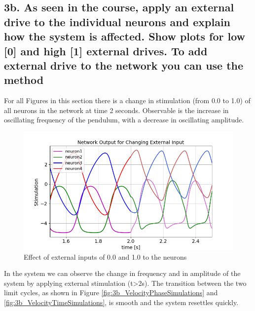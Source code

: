 \documentclass{cmc}
\begin{document}
\subsection*{3b. As seen in the course, apply an external drive to the
  individual neurons and explain how the system is affected. Show
  plots for low [0] and high [1] external drives. To add external
  drive to the network you can use the method \\
   }
\label{sec:4c}

For all Figures in this section there is a change in stimulation (from 0.0 to 1.0) of all neurons in the network at time 2 seconds. Observable is the increase in oscillating frequency of the pendulum, with a decrease in oscillating amplitude. 

\begin{figure}[H]
      \centering
      \includegraphics[width=.7\textwidth]{3b/3b-output.png}
      \caption{Effect of external inputs of 0.0 and 1.0 to the neurons}
      \label{fig:3b_NeuronSimulations}
\end{figure}

In the system we can observe the change in frequency and in amplitude of the system by applying external stimulation (t>2s). The transition between the two limit cycles, as shown in Figure \ref{fig:3b_VelocityPhaseSimulations} and \ref{fig:3b_VelocityTimeSimulations}, is smooth and the system resettles quickly.
\end{document}
